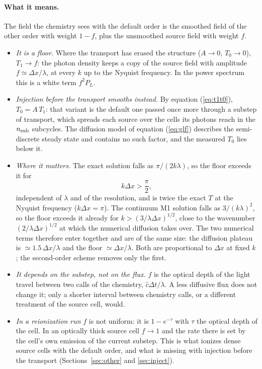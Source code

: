 \documentclass[11pt]{article}
\newcommand{\chat}{\hat{c}}
\newcommand{\dx}{\Delta x}
\begin{document}
\paragraph{What it means.} The field the chemistry sees with the default order is the smoothed field of
the other order with weight $1-f$, plus the unsmoothed source field with weight $f$.
\begin{itemize}
\item \emph{It is a floor.} Where the transport has erased the structure ($A\to0$, $T_0\to0$), $T_1\to f$:
the photon density keeps a copy of the source field with amplitude $f\simeq\dx/\lambda$, at every $k$ up to the
Nyquist frequency. In the power spectrum this is a white term $f^2P_L$.
\item \emph{Injection before the transport smooths instead.} By equation (\ref{eq:t1t0}), $T_0=A\,T_1$: that
variant is the default one passed once more through a substep of transport, which spreads each source over
the cells its photons reach in the $n_{\rm sub}$ subcycles. The diffusion model of equation (\ref{eq:glf})
describes the semi-discrete steady state and contains no such factor, and the measured $T_0$ lies below it.
\item \emph{Where it matters.} The exact solution falls as $\pi/(2k\lambda)$, so the floor exceeds it for
\begin{equation}
k\dx>\frac{\pi}{2},
\end{equation}
independent of $\lambda$ and of the resolution, and is twice the exact $T$ at the Nyquist frequency
($k\dx=\pi$). The continuum M1 solution falls as $3/(k\lambda)^2$, so the floor exceeds it already for
$k>(3/\lambda\dx)^{1/2}$, close to the wavenumber $(2/\lambda\dx)^{1/2}$ at which the numerical diffusion takes
over. The two numerical terms therefore enter together and are of the same size: the diffusion plateau is
$\simeq1.5\,\dx/\lambda$ and the floor $\simeq\dx/\lambda$. Both are proportional to $\dx$ at fixed $k$;
the second-order scheme removes only the first.
\item \emph{It depends on the substep, not on the flux.} $f$ is the optical depth of the light travel between
two calls of the chemistry, $\chat\Delta t/\lambda$. A less diffusive flux does not change it; only a
shorter interval between chemistry calls, or a different treatment of the source cell, would.
\item \emph{In a reionization run} $f$ is not uniform: it is $1-e^{-\tau}$ with $\tau$ the optical depth of the
cell. In an optically thick source cell $f\to1$ and the rate there is set by the cell's own emission of
the current substep. This is what ionizes dense source cells with the default order, and what is missing
with injection before the transport (Sections~\ref{sec:other} and \ref{sec:inject}).
\end{itemize}
\end{document}
